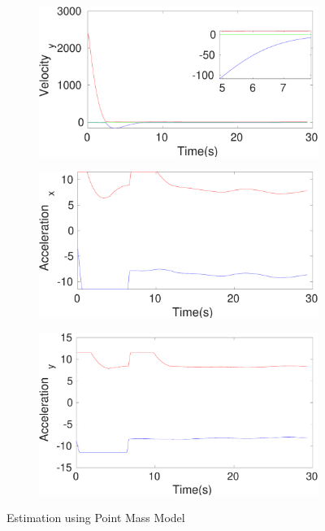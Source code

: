 \begin{figure}[h]
\begin{subfigure}{.5\linewidth}
\end{subfigure}
\begin{subfigure}{.5\linewidth}
\centering
\includegraphics[width=\linewidth]{figures/Prad/s3pmpradVelocity_y}
\end{subfigure}
\begin{subfigure}{.5\linewidth}
\centering
\includegraphics[width=\linewidth]{figures/Prad/s3pmpradAcceleration_x}
\end{subfigure}
\begin{subfigure}{.5\linewidth}
\centering
\includegraphics[width=\linewidth]{figures/Prad/s3pmpradAcceleration_y}
\end{subfigure}
\caption{Estimation using Point Mass Model}
\end{figure}


